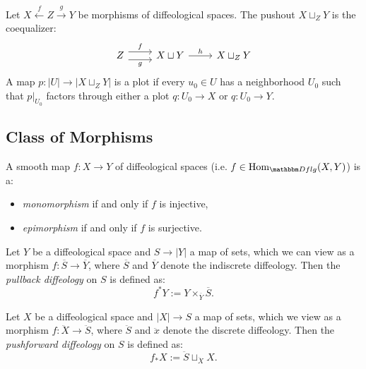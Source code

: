 \documentclass[a4paper,11pt]{article}  %
\newcommand{\Dflg}{\cat[Dflg]}
\begin{document}
\begin{example}[Pushouts]\label{ex:dflg-pushout}
Let \(X \xleftarrow{f} Z \xrightarrow{g} Y\) be morphisms of diffeological spaces. The pushout \(X \sqcup_Z Y\) is the coequalizer:
$$
			\begin{tikzcd}
				Z \ar[r, yshift=4px,"f"]\ar[r, yshift=-4px,"g"'] & X \sqcup Y \ar[r,"h"] & X \sqcup_Z Y
			\end{tikzcd}		
$$
A map \(p : |U| \to |X \sqcup_Z Y|\) is a plot if every \(u_0 \in U\) has a neighborhood \(U_0\) such that \(p|_{U_0}\) factors through either a plot \(q :  U_0 \to X\) or \(q :  U_0 \to Y\).
\end{example}


\subsection{Class of Morphisms}

\begin{proposition}
A smooth map \(f: X \to Y\) of diffeological spaces (i.e. $f \in \Hom_{\Dflg}(X,Y)$) is a:
\begin{itemize}
    \item \emph{monomorphism} if and only if \(f\) is injective,
    \item \emph{epimorphism} if and only if \(f\) is surjective.
\end{itemize}
\end{proposition}


\begin{definition}
Let \(Y\) be a diffeological space and \(S \to |Y|\) a map of sets, which we can view as a morphism \(f : \overline{S}  \to \overline{Y}\), where \(\overline{S} \) and \(\overline{Y} \) denote the indiscrete diffeology. Then the \emph{pullback diffeology} on \(S\) is defined as:
$$
f^*Y := Y \times_{\overline{Y}} \overline{S}.
$$
\end{definition}

\begin{definition}
Let \(X\) be a diffeological space and \(|X| \to S\) a map of sets, which we view as a morphism \(f : \ddot{X} \to \ddot{S}\), where \(\ddot{S}\) and \(\ddot{x}\) denote the discrete diffeology. Then the \emph{pushforward diffeology} on \(S\) is defined as:
$$
f_*X := \ddot{S}  \sqcup_{\ddot{X}} X.
$$
\end{definition}
\end{document}
